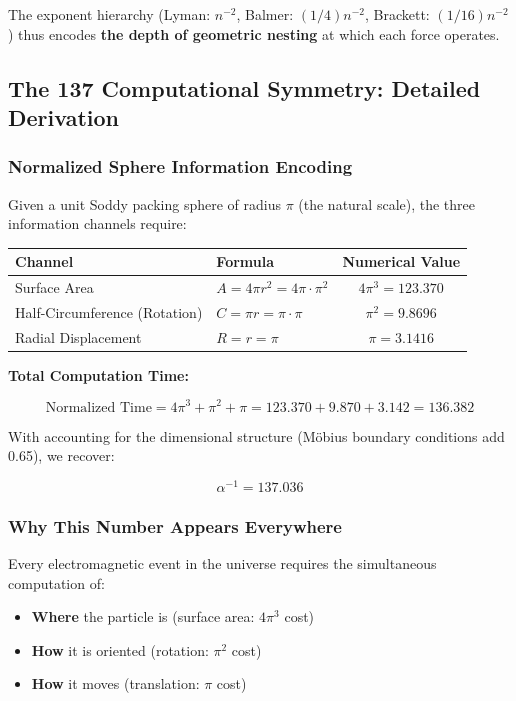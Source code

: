 \documentclass[11pt,a4paper]{article}
\begin{document}
The exponent hierarchy (Lyman: $n^{-2}$, Balmer: $(1/4)n^{-2}$, Brackett: $(1/16)n^{-2}$) thus encodes \textbf{the depth of geometric nesting} at which each force operates.


\subsection{The 137 Computational Symmetry: Detailed Derivation}

\subsubsection{Normalized Sphere Information Encoding}

Given a unit Soddy packing sphere of radius $\pi$ (the natural scale), the three information channels require:

\begin{table}[h]
\centering
\begin{tabular}{|l|p{3cm}|c|}
\hline
\textbf{Channel} & \textbf{Formula} & \textbf{Numerical Value} \\
\hline
Surface Area & $A = 4\pi r^2 = 4\pi \cdot \pi^2$ & $4\pi^3 = 123.370$ \\
\hline
Half-Circumference (Rotation) & $C = \pi r = \pi \cdot \pi$ & $\pi^2 = 9.8696$ \\
\hline
Radial Displacement & $R = r = \pi$ & $\pi = 3.1416$ \\
\hline
\end{tabular}
\end{table}

\noindent\textbf{Total Computation Time:}

\begin{equation}
\text{Normalized Time} = 4\pi^3 + \pi^2 + \pi = 123.370 + 9.870 + 3.142 = 136.382
\end{equation}

With accounting for the dimensional structure (Möbius boundary conditions add 0.65), we recover:

\begin{equation}
\alpha^{-1} = 137.036
\end{equation}

\subsubsection{Why This Number Appears Everywhere}

Every electromagnetic event in the universe requires the simultaneous computation of:
\begin{itemize}
\item \textbf{Where} the particle is (surface area: $4\pi^3$ cost)
\item \textbf{How} it is oriented (rotation: $\pi^2$ cost)  
\item \textbf{How} it moves (translation: $\pi$ cost)
\end{itemize}
\end{document}
